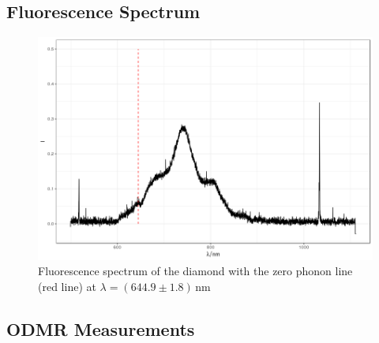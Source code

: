 \subsection{Fluorescence Spectrum}
\begin{figure}
	\centering
	\includegraphics[width=\textwidth]{../figures/fluorescence.png}
	\caption{Fluorescence spectrum of the diamond with the zero phonon line (red line) at $\lambda=(644.9\pm1.8)\,\mathrm{nm}$}
	\label{fig:fluorescence}
\end{figure}

\subsection{ODMR Measurements}